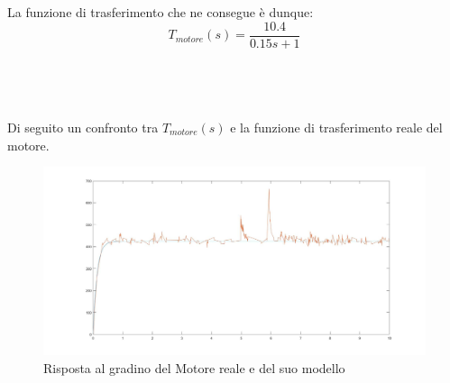 La funzione di trasferimento che ne consegue è dunque:
\\
$$
T_{motore}(s)=\displaystyle\frac{10.4}{0.15s+1}
$$
\\\\\\\\
Di seguito un confronto tra $T_{motore}(s)$ e la funzione di trasferimento reale del motore.
\begin{figure}[ht]
	\centering
	\includegraphics[width=\textwidth]{modMotorvsReale.jpg}
	\caption{Risposta al gradino del Motore reale e del suo modello}
	\label{modMotorvsReale}
\end{figure}

